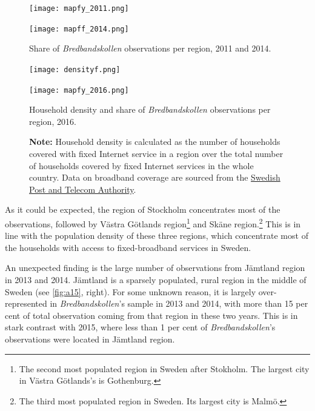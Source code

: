 \documentclass[12pt]{article}
\begin{document}
\begin{figure}[H]
	\begin{minipage}{0.5\textwidth}
        \centering
        \texttt{[image: mapfy\_2011.png]} 
		
    \end{minipage}\hfill
    \begin{minipage}{0.5\textwidth}
        \centering
        \texttt{[image: mapff\_2014.png]}
    \end{minipage}
         \caption{Share of \textit{Bredbandskollen} observations per region, 2011 and 2014.}
        \label{fig:a15}
\end{figure}  

\begin{figure}
    \begin{minipage}{0.5\textwidth}
        \centering
        \texttt{[image: densityf.png]}
    \end{minipage}\hfill
    \begin{minipage}{0.5\textwidth}
        \centering
        \texttt{[image: mapfy\_2016.png]}
    \end{minipage}\hfill    
         \caption{Household density and share of \textit{Bredbandskollen} observations per region, 2016.}
         \caption*{\textbf{Note:} Household density is calculated as the number of households covered with fixed Internet service in a region over the total number of households covered by fixed Internet services in the whole country. Data on broadband coverage are sourced from the \href{http://statistik.pts.se/broadband/}{Swedish Post and Telecom Authority}.}
        \label{fig:a16}
\end{figure}  


As it could be expected, the region of Stockholm concentrates most of the observations, followed by Västra Götlands region\footnote{The second most populated region in Sweden after Stokholm. The largest city in Västra Götlands's is Gothenburg.} and Skäne region.\footnote{The third most populated region in Sweden. Its largest city is Malmö.} This is in line with the population density of these three regions, which concentrate most of the households with access to fixed-broadband services in Sweden. 

An unexpected finding is the large number of observations from Jämtland region in 2013 and 2014. Jämtland is a sparsely populated, rural region in the middle of Sweden (see \autoref{fig:a15}, right). For some unknown reason, it is largely over-represented in \textit{Bredbandskollen}'s sample in 2013 and 2014, with more than 15 per cent of total observation coming from that region in these two years. This is in stark contrast with 2015, where less than 1 per cent of \textit{Bredbandskollen}'s observations were located in Jämtland region.
\end{document}
